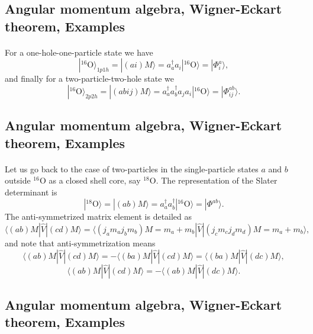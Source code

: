 \documentclass[%
twoside,                 %
final,                   %
10pt]{article}
\begin{document}
\subsection{Angular momentum algebra, Wigner-Eckart theorem, Examples}

\paragraph{}
For a one-hole-one-particle state we have
\[
|^{16}\mathrm{O}\rangle_{1p1h} =|(ai)M\rangle  = a_a^{\dagger}a_i|^{16}\mathrm{O}\rangle=|\Phi_{i}^a\rangle,
\]
and finally for a two-particle-two-hole state we 
\[
|^{16}\mathrm{O}\rangle_{2p2h} =|(abij)M\rangle  = a_a^{\dagger}a_b^{\dagger}a_ja_i|^{16}\mathrm{O}\rangle=|\Phi_{ij}^{ab}\rangle.
\]



\subsection{Angular momentum algebra, Wigner-Eckart theorem, Examples}

\paragraph{}
Let us go back to the case of two-particles in the single-particle states $a$ and $b$ outside ${}^{16}\mbox{O}$ as a closed shell core, say ${}^{18}\mbox{O}$.
The representation of the Slater determinant is 
\[
|^{18}\mathrm{O}\rangle =|(ab)M\rangle  = a^{\dagger}_aa^{\dagger}_b|^{16}\mathrm{O}\rangle=|\Phi^{ab}\rangle.
\]
The anti-symmetrized matrix element is detailed as 
\[
\langle (ab) M | \hat{V} | (cd) M \rangle = \langle (j_am_aj_bm_b)M=m_a+m_b |  \hat{V} | (j_cm_cj_dm_d)M=m_a+m_b \rangle,
\]
and note that anti-symmetrization means 
\[
\langle (ab) M | \hat{V} | (cd) M \rangle =-\langle (ba) M | \hat{V} | (cd) M \rangle =\langle (ba) M | \hat{V} | (dc) M \rangle,
\]
\[
\langle (ab) M | \hat{V} | (cd) M \rangle =-\langle (ab) M | \hat{V} | (dc) M \rangle. 
\]



\subsection{Angular momentum algebra, Wigner-Eckart theorem, Examples}

\end{document}

